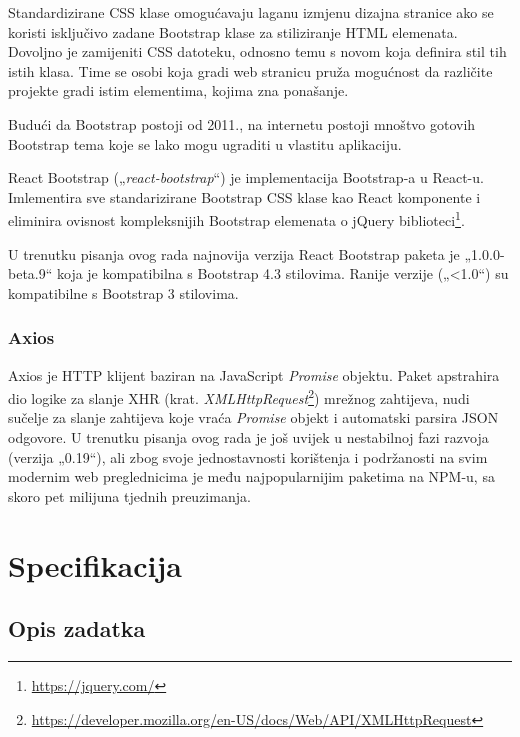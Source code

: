 \documentclass[times, utf8, diplomski, numeric]{fer}
\newcommand{\razmakp}{\vspace{18pt}}
\newcommand{\razmaks}{\vspace{10pt}}
\begin{document}
Standardizirane CSS klase omogućavaju laganu izmjenu dizajna stranice ako se koristi isključivo zadane Bootstrap klase za stiliziranje HTML elemenata.
Dovoljno je zamijeniti CSS datoteku, odnosno temu s novom koja definira stil tih istih klasa.
Time se osobi koja gradi web stranicu pruža mogućnost da različite projekte gradi istim elementima, kojima zna ponašanje.

Budući da Bootstrap postoji od 2011.\citep{wiki_bs}, na internetu postoji mnoštvo gotovih Bootstrap tema koje se lako mogu ugraditi u vlastitu aplikaciju.

\razmakp

React Bootstrap („\emph{react-bootstrap}“) je implementacija Bootstrap-a u React-u.
Imlementira sve standarizirane Bootstrap CSS klase kao React komponente i eliminira ovisnost kompleksnijih Bootstrap elemenata o jQuery biblioteci\footnote{\url{https://jquery.com/}}.

U trenutku pisanja ovog rada najnovija verzija React Bootstrap paketa je „1.0.0-beta.9“ koja je kompatibilna s Bootstrap 4.3 stilovima.
Ranije verzije („<1.0“) su kompatibilne s Bootstrap 3 stilovima\citep{bs_react}.


\razmaks
\subsection{Axios}

Axios je HTTP klijent baziran na JavaScript \emph{Promise} objektu.
Paket apstrahira dio logike za slanje XHR (krat. \emph{XMLHttpRequest}\footnote{\url{https://developer.mozilla.org/en-US/docs/Web/API/XMLHttpRequest}}) mrežnog zahtijeva, nudi sučelje za slanje zahtijeva koje vraća \emph{Promise} objekt i automatski parsira JSON odgovore.
U trenutku pisanja ovog rada je još uvijek u nestabilnoj fazi razvoja (verzija „0.19“), ali zbog svoje jednostavnosti korištenja i podržanosti na svim modernim web preglednicima je među najpopularnijim paketima na NPM-u, sa skoro pet milijuna tjednih preuzimanja\citep{axios}.



\chapter{Specifikacija}


\section{Opis zadatka}
\end{document}
